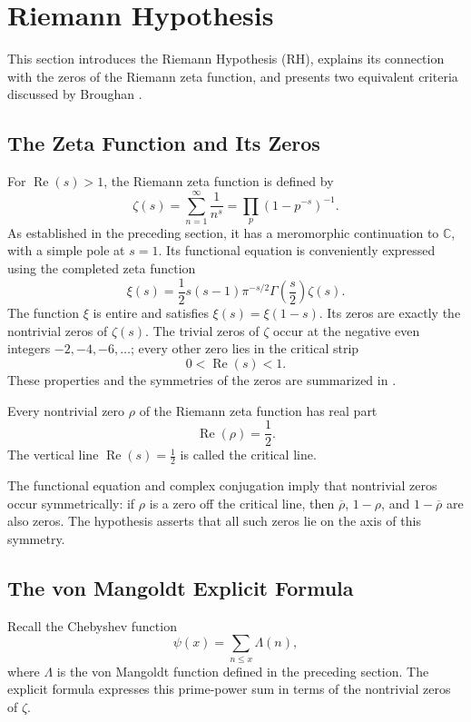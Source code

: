 \section{Riemann Hypothesis}

This section introduces the Riemann Hypothesis (RH), explains its connection with the zeros of the Riemann zeta function, and presents two equivalent criteria discussed by Broughan \cite[Chapters 2, 4, and 7]{Broughan2017}.

\subsection{The Zeta Function and Its Zeros}

For $\operatorname{Re}(s)>1$, the Riemann zeta function is defined by
\[
 \zeta(s)=\sum_{n=1}^{\infty}\frac{1}{n^s}
 =\prod_p\left(1-p^{-s}\right)^{-1}.
\]
As established in the preceding section, it has a meromorphic continuation to $\mathbb{C}$, with a simple pole at $s=1$. Its functional equation is conveniently expressed using the completed zeta function
\[
 \xi(s)=\frac12s(s-1)\pi^{-s/2}\Gamma\!\left(\frac{s}{2}\right)\zeta(s).
\]
The function $\xi$ is entire and satisfies $\xi(s)=\xi(1-s)$. Its zeros are exactly the nontrivial zeros of $\zeta(s)$. The trivial zeros of $\zeta$ occur at the negative even integers $-2,-4,-6,\ldots$; every other zero lies in the critical strip
\[
 0<\operatorname{Re}(s)<1.
\]
These properties and the symmetries of the zeros are summarized in \cite[Section 2.2]{Broughan2017}.

\begin{conjecture}
Every nontrivial zero $\rho$ of the Riemann zeta function has real part
\[
 \operatorname{Re}(\rho)=\frac12.
\]
The vertical line $\operatorname{Re}(s)=\tfrac12$ is called the critical line.
\end{conjecture}

The functional equation and complex conjugation imply that nontrivial zeros occur symmetrically: if $\rho$ is a zero off the critical line, then $\overline{\rho}$, $1-\rho$, and $1-\overline{\rho}$ are also zeros. The hypothesis asserts that all such zeros lie on the axis of this symmetry.

\subsection{The von Mangoldt Explicit Formula}

Recall the Chebyshev function
\[
 \psi(x)=\sum_{n\leq x}\Lambda(n),
\]
where $\Lambda$ is the von Mangoldt function defined in the preceding section. The explicit formula expresses this prime-power sum in terms of the nontrivial zeros of $\zeta$.

